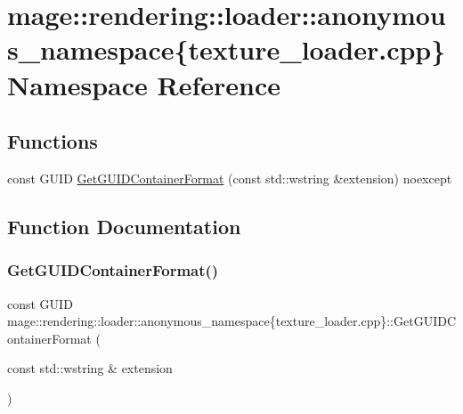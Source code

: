 \hypertarget{namespacemage_1_1rendering_1_1loader_1_1anonymous__namespace_02texture__loader_8cpp_03}{}\section{mage\+:\+:rendering\+:\+:loader\+:\+:anonymous\+\_\+namespace\{texture\+\_\+loader.\+cpp\} Namespace Reference}
\label{namespacemage_1_1rendering_1_1loader_1_1anonymous__namespace_02texture__loader_8cpp_03}
\subsection*{Functions}
\begin{DoxyCompactItemize}
\item 
const G\+U\+ID \mbox{\hyperlink{namespacemage_1_1rendering_1_1loader_1_1anonymous__namespace_02texture__loader_8cpp_03_aa7dcc0b18e23ca9e8c5213c5bba495e4}{Get\+G\+U\+I\+D\+Container\+Format}} (const std\+::wstring \&extension) noexcept
\end{DoxyCompactItemize}


\subsection{Function Documentation}
\mbox{\label{namespacemage_1_1rendering_1_1loader_1_1anonymous__namespace_02texture__loader_8cpp_03_aa7dcc0b18e23ca9e8c5213c5bba495e4}} 
\subsubsection{\texorpdfstring{Get\+G\+U\+I\+D\+Container\+Format()}{GetGUIDContainerFormat()}}
{\footnotesize\ttfamily const G\+U\+ID mage\+::rendering\+::loader\+::anonymous\+\_\+namespace\{texture\+\_\+loader.\+cpp\}\+::Get\+G\+U\+I\+D\+Container\+Format (\begin{DoxyParamCaption}\item[{const std\+::wstring \&}]{extension }\end{DoxyParamCaption})\hspace{0.3cm}{\ttfamily [noexcept]}}


